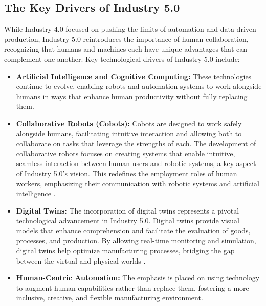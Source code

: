 \subsection{The Key Drivers of Industry 5.0}
While Industry 4.0 focused on pushing the limits of automation and data-driven production, Industry 5.0 reintroduces the importance of human collaboration,
recognizing that humans and machines each have unique advantages that can complement one another. Key technological drivers of Industry 5.0 include:
\begin{itemize} \item \textbf{Artificial Intelligence and Cognitive Computing:} These technologies continue to evolve, enabling robots and automation 
                systems to work alongside humans in ways that enhance human productivity without fully replacing them.
                
                \item \textbf{Collaborative Robots (Cobots):} Cobots are designed to work safely alongside humans, facilitating intuitive interaction 
                and allowing both to collaborate on tasks that leverage the strengths of each. The development of collaborative robots focuses on 
                creating systems that enable intuitive, seamless interaction between human users and robotic systems, a key aspect of Industry 5.0’s 
                vision. This redefines the employment roles of human workers, emphasizing their communication with robotic systems 
                and artificial intelligence \cite{10577684}.

                \item \textbf{Digital Twins:} The incorporation of digital twins represents a pivotal technological advancement in Industry 5.0. 
                Digital twins provide visual models that enhance comprehension and facilitate the evaluation of goods, processes, and production. 
                By allowing real-time monitoring and simulation, digital twins help optimize manufacturing processes, bridging the gap between the virtual 
                and physical worlds \cite{10577684}.

                \item \textbf{Human-Centric Automation:} The emphasis is placed on using technology to augment human capabilities rather than replace them,
                fostering a more inclusive, creative, and flexible manufacturing environment.
\end{itemize}


